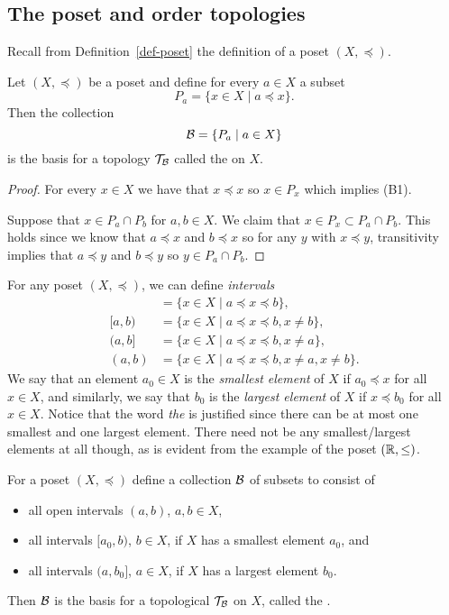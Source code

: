 \subsection{The poset and order topologies}
Recall from Definition~\ref{def-poset} the definition of a poset $(X,\preceq)$.
\begin{prop}
  \label{poset-top-def}
  Let $(X,\preceq)$ be a poset and define for every $a \in X$ a subset
  \[
    P_a = \{ x \in X \mid a \preceq x\}.
  \]
  Then the collection
  \[
    \mathcal{B} = \{ P_a \mid a \in X \}
  \]
  is the basis for a topology $\mathcal{T}_{\mathcal{B}}$ called the  on $X$.
\end{prop}
\begin{proof}
  For every $x \in X$ we have that $x \preceq x$ so $x \in P_x$ which implies (B1).
  
  Suppose that $x \in P_a \cap P_b$ for $a,b \in X$. We claim that $x \in P_x \subset P_a \cap P_b$. This holds since we know that $a \preceq x$ and $b \preceq x$ so for any $y$ with $x \preceq y$, transitivity implies that $a \preceq y$ and $b \preceq y$ so $y \in P_a \cap P_b$.
\end{proof}
For any poset $(X,\preceq)$, we can define \emph{intervals}
\begin{align*}
  [a,b] &= \{ x \in X \mid a \preceq x \preceq b \},\\
  [a,b) &= \{ x \in X \mid a \preceq x \preceq b, x \not= b \},\\
  (a,b] &= \{ x \in X \mid a \preceq x \preceq b, x \not= a \},\\
  (a,b) &= \{ x \in X \mid a \preceq x \preceq b, x\not= a, x \not= b \}.
\end{align*}
We say that an element $a_0 \in X$ is the \emph{smallest element} of $X$ if $a_0 \preceq x$ for all $x \in X$, and similarly, we say that $b_0$ is the \emph{largest element} of $X$ if $x \preceq b_0$ for all $x \in X$. Notice that the word \emph{the} is justified since there can be at most one smallest and one largest element. There need not be any smallest/largest elements at all though, as is evident from the example of the poset $(\mathbb{R},\leq)$.
\begin{prop}
  For a poset $(X,\preceq)$ define a collection $\mathcal{B}$ of subsets to consist of
  \begin{itemize}
    \item all open intervals $(a,b)$, $a,b \in X$,
    \item all intervals $[a_0,b)$, $b \in X$, if $X$ has a smallest element $a_0$, and
    \item all intervals $(a,b_0]$, $a \in X$, if $X$ has a largest element $b_0$.
  \end{itemize}
  Then $\mathcal{B}$ is the basis for a topological $\mathcal{T}_{\mathcal{B}}$ on $X$, called the .
\end{prop}
